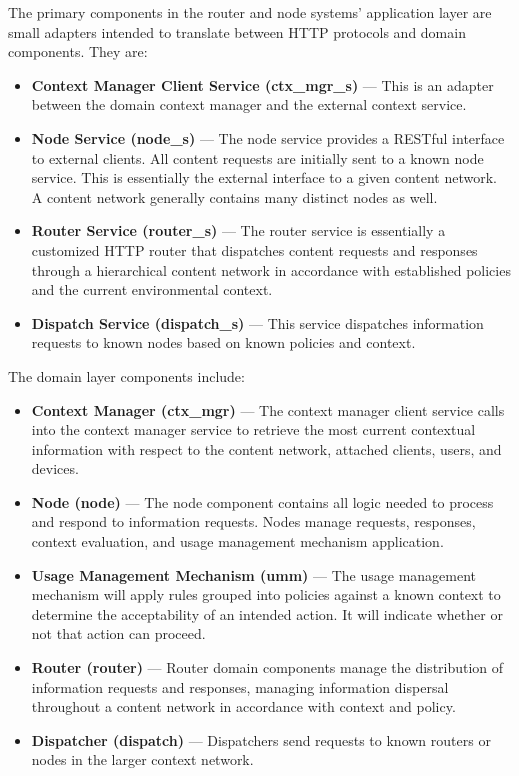 The primary components in the router and node systems' application layer are small adapters intended to translate between HTTP protocols and domain components.  They are:

\begin{itemize}
\item \textbf{Context Manager Client Service (ctx\_mgr\_s)} --- This is an adapter between the domain context manager and the external context service.
\item \textbf{Node Service (node\_s)} --- The node service provides a RESTful interface to external clients.  All content requests are initially sent to a known node service.  This is essentially the external interface to a given content network.  A content network generally contains many distinct nodes as well.
\item \textbf{Router Service (router\_s)} --- The router service is essentially a customized HTTP router that dispatches content requests and responses through a hierarchical content network in accordance with established policies and the current environmental context.
\item \textbf{Dispatch Service (dispatch\_s)} --- This service dispatches information requests to known nodes based on known policies and context.
\end{itemize}

The domain layer components include:

\begin{itemize}
\item \textbf{Context Manager (ctx\_mgr)} --- The context manager client service calls into the context manager service to retrieve the most current contextual information with respect to the content network, attached clients, users, and devices.
\item \textbf{Node (node)} --- The node component contains all logic needed to process and respond to information requests.  Nodes manage requests, responses, context evaluation, and usage management mechanism application.
\item \textbf{Usage Management Mechanism (umm)} --- The usage management mechanism will apply rules grouped into policies against a known context to determine the acceptability of an intended action.  It will indicate whether or not that action can proceed.
\item \textbf{Router (router)} --- Router domain components manage the distribution of information requests and responses, managing information dispersal throughout a content network in accordance with context and policy.
\item \textbf{Dispatcher (dispatch)} --- Dispatchers send requests to known routers or nodes in the larger context network.
\end{itemize}


